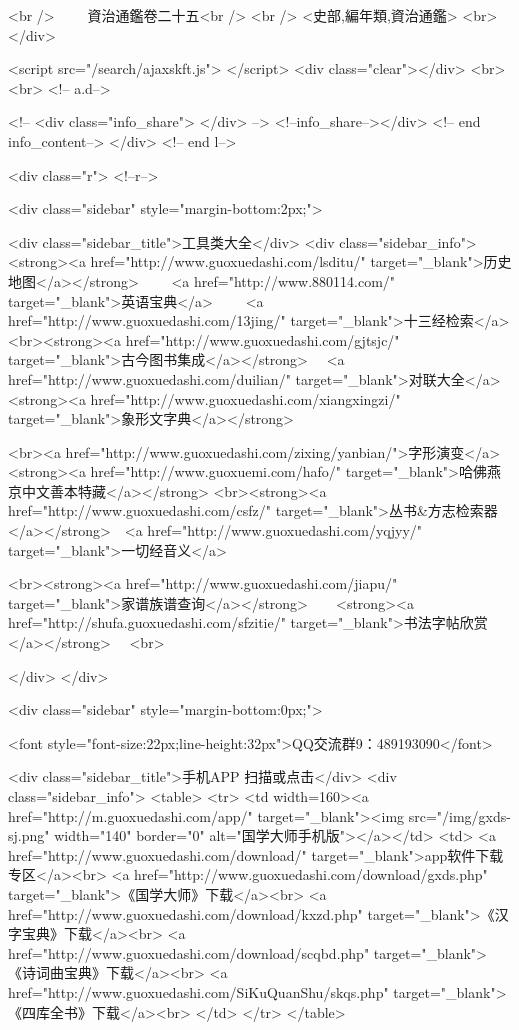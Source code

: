 <br />
　　資治通鑑卷二十五<br />
<br />
<史部,編年類,資治通鑑>  <br>
   </div> 

<script src="/search/ajaxskft.js"> </script>
 <div class="clear"></div>
<br>
<br>
 <!-- a.d-->

 <!--
<div class="info_share">
</div> 
-->
 <!--info_share--></div>   <!-- end info_content-->
  </div> <!-- end l-->

<div class="r">   <!--r-->



<div class="sidebar"  style="margin-bottom:2px;">

 
<div class="sidebar_title">工具类大全</div>
<div class="sidebar_info">
<strong><a href="http://www.guoxuedashi.com/lsditu/" target="_blank">历史地图</a></strong>　　
<a href="http://www.880114.com/" target="_blank">英语宝典</a>　　
<a href="http://www.guoxuedashi.com/13jing/" target="_blank">十三经检索</a>　
<br><strong><a href="http://www.guoxuedashi.com/gjtsjc/" target="_blank">古今图书集成</a></strong>　
<a href="http://www.guoxuedashi.com/duilian/" target="_blank">对联大全</a>　<strong><a href="http://www.guoxuedashi.com/xiangxingzi/" target="_blank">象形文字典</a></strong>　

<br><a href="http://www.guoxuedashi.com/zixing/yanbian/">字形演变</a>　　<strong><a href="http://www.guoxuemi.com/hafo/" target="_blank">哈佛燕京中文善本特藏</a></strong>
<br><strong><a href="http://www.guoxuedashi.com/csfz/" target="_blank">丛书&方志检索器</a></strong>　<a href="http://www.guoxuedashi.com/yqjyy/" target="_blank">一切经音义</a>　　

<br><strong><a href="http://www.guoxuedashi.com/jiapu/" target="_blank">家谱族谱查询</a></strong>　　<strong><a href="http://shufa.guoxuedashi.com/sfzitie/" target="_blank">书法字帖欣赏</a></strong>　
<br>

</div>
</div>


<div class="sidebar" style="margin-bottom:0px;">

<font style="font-size:22px;line-height:32px">QQ交流群9：489193090</font>


<div class="sidebar_title">手机APP 扫描或点击</div>
<div class="sidebar_info">
<table>
<tr>
	<td width=160><a href="http://m.guoxuedashi.com/app/" target="_blank"><img src="/img/gxds-sj.png" width="140"  border="0" alt="国学大师手机版"></a></td>
	<td>
<a href="http://www.guoxuedashi.com/download/" target="_blank">app软件下载专区</a><br>
<a href="http://www.guoxuedashi.com/download/gxds.php" target="_blank">《国学大师》下载</a><br>
<a href="http://www.guoxuedashi.com/download/kxzd.php" target="_blank">《汉字宝典》下载</a><br>
<a href="http://www.guoxuedashi.com/download/scqbd.php" target="_blank">《诗词曲宝典》下载</a><br>
<a href="http://www.guoxuedashi.com/SiKuQuanShu/skqs.php" target="_blank">《四库全书》下载</a><br>
</td>
</tr>
</table>

